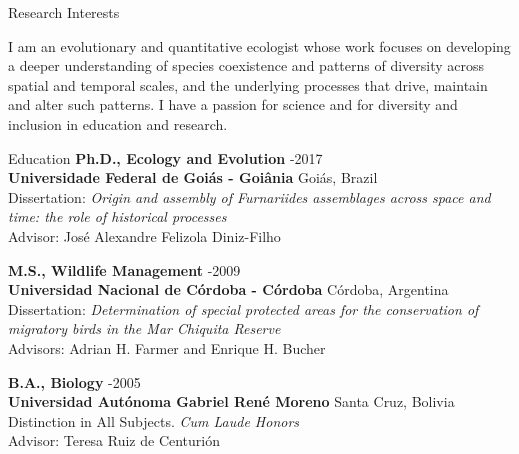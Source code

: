 \documentclass{resume} %
\begin{document}
\begin{rSection}{Research Interests}

{\normalfont I am an evolutionary and quantitative ecologist whose work focuses on developing a deeper understanding of species coexistence and patterns of diversity across spatial and temporal scales, and the underlying processes that drive, maintain and alter such patterns. I have a passion for science and for diversity and inclusion in education and research.}

\end{rSection}


\begin{rSection}{Education}
{\bf Ph.D., Ecology and Evolution} \hfill {}-2017 \\ 
{\bf Universidade Federal de Goiás - Goiânia} \hfill \normalfont Goiás, Brazil \\
{\normalfont Dissertation: \emph{Origin and assembly of Furnariides assemblages across space and time: the role of historical processes}} \\
{\normalfont Advisor: José Alexandre Felizola Diniz-Filho} \smallskip 

{\bf M.S., Wildlife Management} \hfill {}-2009 \\
{\bf Universidad Nacional de Córdoba - Córdoba} \hfill \normalfont Córdoba, Argentina \\
{\normalfont Dissertation: \emph{Determination of special protected areas for the conservation of migratory birds in the Mar Chiquita Reserve}} \\
{\normalfont Advisors: Adrian H. Farmer and Enrique H. Bucher} \smallskip 

{\bf B.A., Biology} \hfill {}-2005 \\
{\bf Universidad Autónoma Gabriel René Moreno} \hfill \normalfont Santa Cruz, Bolivia \\
{\normalfont Distinction in All Subjects. \emph{Cum Laude Honors}} \\ 
{\normalfont Advisor: Teresa Ruiz de Centurión} \smallskip 
\end{rSection}

\end{document}
